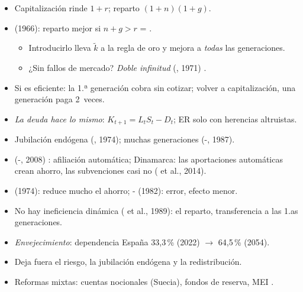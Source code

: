 \documentclass{article}
\begin{document}
\begin{columnas}
\begin{itemize}
\item Capitalización rinde $1+r$; reparto $(1+n)(1+g)$.
\item {} (1966): reparto mejor si $n+g>r$ = .
  \begin{itemize}
  \item Introducirlo lleva $\tilde k$ a la regla de oro y mejora a \emph{todas} las generaciones.
  \item ¿Sin fallos de mercado? \emph{Doble infinitud} (, 1971) .
  \end{itemize}
\item Si es eficiente: la 1.ª generación cobra sin cotizar; volver a capitalización, una generación paga 2~veces.
\item \emph{La deuda hace lo mismo}: $K_{t+1}=L_tS_t-D_t$; ER solo con herencias altruistas.
\end{itemize}
\begin{itemize}
\item Jubilación endógena (, 1974); muchas generaciones (-, 1987).
\item {} (-, 2008) : afiliación automática; Dinamarca: las aportaciones automáticas crean ahorro, las subvenciones casi no ( et al., 2014).
\end{itemize}
\begin{itemize}
\item {} (1974): reduce mucho el ahorro; - (1982): error, efecto menor.
\item No hay ineficiencia dinámica ( et al., 1989): el reparto, transferencia a las 1.as generaciones.
\item \emph{Envejecimiento}: dependencia España 33,3\,\% (2022) $\to$ 64,5\,\% (2054).
\end{itemize}
\begin{itemize}
\item Deja fuera el riesgo, la jubilación endógena y la redistribución.
\item Reformas mixtas: cuentas nocionales (Suecia), fondos de reserva, MEI .
\end{itemize}


\end{columnas}
\end{document}
